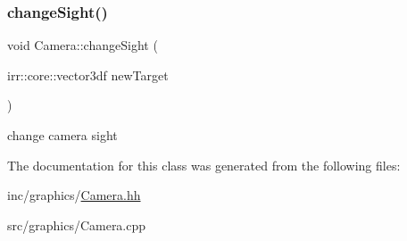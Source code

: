 \subsubsection{\texorpdfstring{change\+Sight()}{changeSight()}}
{\footnotesize\ttfamily void Camera\+::change\+Sight (\begin{DoxyParamCaption}\item[{irr\+::core\+::vector3df}]{new\+Target }\end{DoxyParamCaption})}



change camera sight 



The documentation for this class was generated from the following files\+:\begin{DoxyCompactItemize}
\item 
inc/graphics/\hyperlink{Camera_8hh}{Camera.\+hh}\item 
src/graphics/Camera.\+cpp\end{DoxyCompactItemize}

